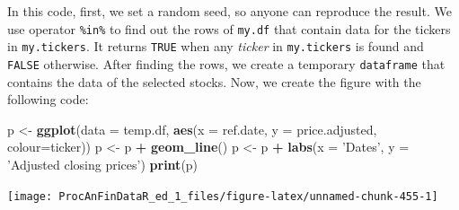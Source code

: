 \documentclass[11pt,]{book}
\newenvironment{Shaded}{\begin{snugshade}}{\end{snugshade}}
\newcommand{\KeywordTok}[1]{\textcolor[rgb]{0.27,0.27,0.27}{\textbf{#1}}}
\newcommand{\DataTypeTok}[1]{\textcolor[rgb]{0.27,0.27,0.27}{#1}}
\newcommand{\DecValTok}[1]{\textcolor[rgb]{0.06,0.06,0.06}{#1}}
\newcommand{\StringTok}[1]{\textcolor[rgb]{0.5,0.5,0.5}{#1}}
\newcommand{\CommentTok}[1]{\textcolor[rgb]{0.56,0.35,0.01}{\textit{#1}}}
\newcommand{\OperatorTok}[1]{\textcolor[rgb]{0.81,0.36,0.00}{\textbf{#1}}}
\newcommand{\NormalTok}[1]{#1}
\begin{document}
\begin{Shaded}
\end{Shaded}

In this code, first, we set a random seed, so anyone can reproduce the
result. We use operator \texttt{\%in\%} to find out the rows of
\texttt{my.df} that contain data for the tickers in \texttt{my.tickers}.
It returns \texttt{TRUE} when any \emph{ticker} in \texttt{my.tickers}
is found and \texttt{FALSE} otherwise. After finding the rows, we create
a temporary \texttt{dataframe} that contains the data of the selected
stocks. Now, we create the figure with the following code:

\begin{Shaded}
\begin{Highlighting}[]
\NormalTok{p <-}\StringTok{ }\KeywordTok{ggplot}\NormalTok{(}\DataTypeTok{data =}\NormalTok{ temp.df, }\KeywordTok{aes}\NormalTok{(}\DataTypeTok{x =}\NormalTok{ ref.date, }
                                \DataTypeTok{y =}\NormalTok{ price.adjusted, }
                                \DataTypeTok{colour=}\NormalTok{ticker))}
\NormalTok{p <-}\StringTok{ }\NormalTok{p }\OperatorTok{+}\StringTok{ }\KeywordTok{geom_line}\NormalTok{()}
\NormalTok{p <-}\StringTok{ }\NormalTok{p }\OperatorTok{+}\StringTok{ }\KeywordTok{labs}\NormalTok{(}\DataTypeTok{x =} \StringTok{'Dates'}\NormalTok{, }\DataTypeTok{y =} \StringTok{'Adjusted closing prices'}\NormalTok{)}
\KeywordTok{print}\NormalTok{(p)}
\end{Highlighting}
\end{Shaded}

\begin{center}\texttt{[image: ProcAnFinDataR\_ed\_1\_files/figure-latex/unnamed-chunk-455-1]} \end{center}
\end{document}
